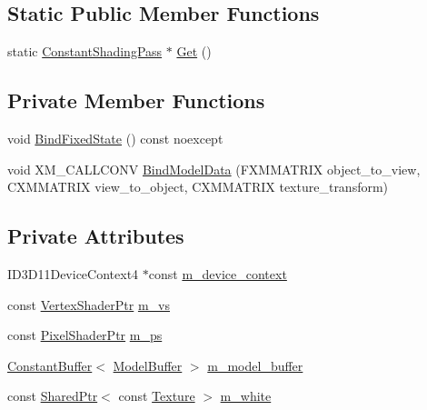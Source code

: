 \subsection*{Static Public Member Functions}
\begin{DoxyCompactItemize}
\item 
static \hyperlink{classmage_1_1_constant_shading_pass}{Constant\+Shading\+Pass} $\ast$ \hyperlink{classmage_1_1_constant_shading_pass_a135bc9dc8b4f2abf209c094980988364}{Get} ()
\end{DoxyCompactItemize}
\subsection*{Private Member Functions}
\begin{DoxyCompactItemize}
\item 
void \hyperlink{classmage_1_1_constant_shading_pass_abaffc9382398ac71050705e55f02b4fd}{Bind\+Fixed\+State} () const noexcept
\item 
void X\+M\+\_\+\+C\+A\+L\+L\+C\+O\+NV \hyperlink{classmage_1_1_constant_shading_pass_a512f1c4284e475e94502530bd37367b4}{Bind\+Model\+Data} (F\+X\+M\+M\+A\+T\+R\+IX object\+\_\+to\+\_\+view, C\+X\+M\+M\+A\+T\+R\+IX view\+\_\+to\+\_\+object, C\+X\+M\+M\+A\+T\+R\+IX texture\+\_\+transform)
\end{DoxyCompactItemize}
\subsection*{Private Attributes}
\begin{DoxyCompactItemize}
\item 
I\+D3\+D11\+Device\+Context4 $\ast$const \hyperlink{classmage_1_1_constant_shading_pass_a34769eb874a24f75c1d9ed8a6610eddc}{m\+\_\+device\+\_\+context}
\item 
const \hyperlink{namespacemage_a1f19b094f771e30bc0a6c1cebcc0dd58}{Vertex\+Shader\+Ptr} \hyperlink{classmage_1_1_constant_shading_pass_ac714700a87f0eb41b2316c8d3e664811}{m\+\_\+vs}
\item 
const \hyperlink{namespacemage_acbec875bb5e5e085e32ed244a24d2b6f}{Pixel\+Shader\+Ptr} \hyperlink{classmage_1_1_constant_shading_pass_ae86bc45868ba10d2d399d27bc10534f9}{m\+\_\+ps}
\item 
\hyperlink{classmage_1_1_constant_buffer}{Constant\+Buffer}$<$ \hyperlink{structmage_1_1_model_buffer}{Model\+Buffer} $>$ \hyperlink{classmage_1_1_constant_shading_pass_ae828b9ae1e4cd281f346aca0db34c015}{m\+\_\+model\+\_\+buffer}
\item 
const \hyperlink{namespacemage_a1e01ae66713838a7a67d30e44c67703e}{Shared\+Ptr}$<$ const \hyperlink{classmage_1_1_texture}{Texture} $>$ \hyperlink{classmage_1_1_constant_shading_pass_aa5c9222b0de16e351b90752150d584d1}{m\+\_\+white}
\end{DoxyCompactItemize}


